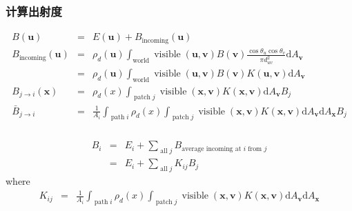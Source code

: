 \documentclass{beamer}
\newcommand{\mathd}{\mathrm{d}}
\newcommand{\nospace}{}
\newcommand{\tmmathbf}[1]{\ensuremath{\boldsymbol{#1}}}
\newcommand{\tmop}[1]{\ensuremath{\operatorname{#1}}}
\begin{document}
{{\begin{frame}
  \frametitle{计算出射度}
  \begin{eqnarray*}
    B (\tmmathbf{u}) & = & E (\tmmathbf{u}) + B_{\tmop{incoming}}
    (\tmmathbf{u})\\
    B_{\tmop{incoming}} (\tmmathbf{u}) & = & \rho_d (\tmmathbf{u})
    \int_{\tmop{world}} \tmop{visible} (\tmmathbf{u}, \tmmathbf{v}) B
    (\tmmathbf{v}) \frac{\cos \theta_u \cos \theta_v}{\pi d^2_{u \nospace v}}
    \mathd A_{\tmmathbf{v}}\\
    & = & \rho_d (\tmmathbf{u}) \int_{\tmop{world}} \tmop{visible}
    (\tmmathbf{u}, \tmmathbf{v}) B (\tmmathbf{v}) K (\tmmathbf{u},
    \tmmathbf{v}) \mathd A_{\tmmathbf{v}}\\
    B_{j \rightarrow i} (\tmmathbf{x}) & = & \rho_d (x) \int_{\tmop{patch} j}
    \tmop{visible} (\tmmathbf{x}, \tmmathbf{v}) K (\tmmathbf{x}, \tmmathbf{v})
    \mathd A_{\tmmathbf{v}} B_j\\
    \bar{B}_{j \rightarrow i} & = & \frac{1}{A_i} \int_{\tmop{path} i} \rho_d
    (x) \int_{\tmop{patch} j} \tmop{visible} (\tmmathbf{x}, \tmmathbf{v}) K
    (\tmmathbf{x}, \tmmathbf{v}) \mathd A_{\tmmathbf{v}} \mathd
    A_{\tmmathbf{x}} B_j
  \end{eqnarray*}
\end{frame}

\begin{frame}
  \frametitle{}
  \begin{eqnarray*}
    B_i & = & E_i + \sum_{\tmop{all} j} B_{\text{average incoming at $i$ from
    $j$}}\\
    & = & E_i + \sum_{\tmop{all} j} K_{i \nospace j} B_j
  \end{eqnarray*}
  where
  \begin{eqnarray*}
    K_{i \nospace j} & = & \frac{1}{A_i} \int_{\tmop{path} i} \rho_d (x)
    \int_{\tmop{patch} j} \tmop{visible} (\tmmathbf{x}, \tmmathbf{v}) K
    (\tmmathbf{x}, \tmmathbf{v}) \mathd A_{\tmmathbf{v}} \mathd
    A_{\tmmathbf{x}}
  \end{eqnarray*}
\end{frame}}}
\end{document}
